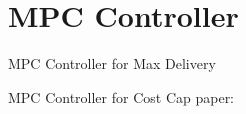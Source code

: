 \documentclass[../main.tex]{subfiles}
\begin{document}
	\chapter{MPC Controller}
	
	
	\begin{section}{MPC Controller for Max Delivery}
		
	\end{section}
	
	\begin{section} {MPC Controller for Cost Cap}
		paper: \cite{yang2019bid}
	\end{section}
	
\end{document}
